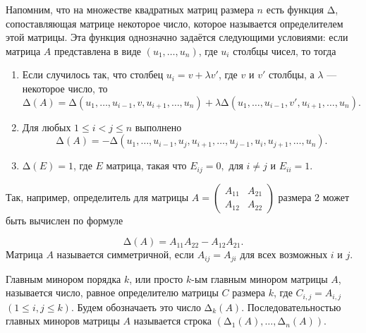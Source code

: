 \renewcommand{\mb}[1]{\mathbb{#1}}
\renewcommand{\ol}[1]{\overline{#1}}
\renewcommand{\tbf}[1]{\textbf{#1}}

Напомним, что на множестве квадратных матриц размера $n$ есть функция $\text{Δ}$, сопоставляющая матрице некоторое число, которое называется определителем этой матрицы.
Эта функция однозначно задаётся следующими условиями:
если матрица $A$ представлена в виде $(u_1, \dots, u_n)$, где $u_i$ столбцы чисел, то тогда

\begin{enumerate}
\item  Если случилось так, что столбец $u_i=v + \lambda v'$, где $v$ и $v'$ столбцы, а $\lambda$ --- некоторое число, то
$$\text{Δ}(A)=\text{Δ}(u_1, \dots, u_{i-1}, v, u_{i+1}, \dots, u_n) + \lambda\text{Δ}(u_1, \dots, u_{i-1}, v', u_{i+1}, \dots, u_n).$$
\item  Для любых $1\leq i<j\leq n$ выполнено
$$\text{Δ}(A)=-\text{Δ}(u_1, \dots, u_{i-1}, u_j, u_{i+1}, \dots, u_{j-1}, u_{i}, u_{j+1}, \dots, u_n).$$
\item  $\text{Δ}(E)=1$, где $E$ матрица, такая что $E_{ij}=0, $ для $i\neq j$ и $E_{ii}=1$.
\end{enumerate}
Так, например, определитель для матрицы $A=\left(\begin{smallmatrix}A_{11} & A_{21}\\ A_{12} & A_{22}\end{smallmatrix}\right)$ размера 2 может быть вычислен по формуле

$$\text{Δ}(A)= A_{11}A_{22}-A_{12}A_{21} .$$
Матрица $A$ называется симметричной, если $A_{i j}=A_{j i}$ для всех возможных $i$ и $j$.

Главным минором порядка $k$, или просто $k$-ым главным минором матрицы $A$, называется число, равное определителю матрицы $C$ размера $k$, где $C_{i, j}= A_{i, j}$ $(1 \leq i, j \leq k)$. Будем обозначаеть это число $\text{Δ}_k(A)$. Последовательностью главных миноров матрицы $A$ называется строка
$(\text{Δ}_1(A), \dots , \text{Δ}_n(A))$.


